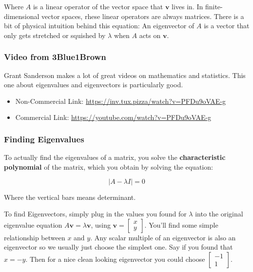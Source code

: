 Where \(A\) is a linear operator of the vector space that \(\mathbf{v}\)
lives in. In finite-dimensional vector spaces, rhese linear operators
are always matrices. There is a bit of physical intuition behind this
equation: An eigenvector of \(A\) is a vector that only gets stretched
or squished by \(\lambda\) when \(A\) acts on \(\mathbf{v}\).

\subsubsection{Video from 3Blue1Brown}\label{video-from-3blue1brown}

Grant Sanderson makes a lot of great videos on mathematics and
statistics. This one about eigenvalues and eigenvectors is particularly
good.

\href{https://inv.tux.pizza/watch?v=PFDu9oVAE-g}{\pandocbounded{\texttt{[image: https://markdown-videos-api.jorgenkh.no/youtube/PFDu9oVAE-g?width=720\&height=405]}}}

\begin{itemize}
\tightlist
\item
  Non-Commercial Link: \url{https://inv.tux.pizza/watch?v=PFDu9oVAE-g}
\item
  Commercial Link: \url{https://youtube.com/watch?v=PFDu9oVAE-g}
\end{itemize}

\subsubsection{Finding Eigenvalues}\label{finding-eigenvalues}

To actually find the eigenvalues of a matrix, you solve the
\textbf{characteristic polynomial} of the matrix, which you obtain by
solving the equation:

\[
|A - \lambda I | = 0 
\]

Where the vertical bars means determinant.

To find Eigenvectors, simply plug in the values you found for
\(\lambda\) into the original eigenvalue equation
\(A\mathbf{v} = \lambda \mathbf{v}\), using
\(\mathbf{v} = \begin{bmatrix}x \\ y\end{bmatrix}\). You'll find some
simple relationship between \(x\) and \(y\). Any scalar multiple of an
eigenvector is also an eigenvector so we usually just choose the
simplest one. Say if you found that \(x = -y\). Then for a nice clean
looking eigenvector you could choose
\(\begin{bmatrix} -1 \\ 1\end{bmatrix}\).

